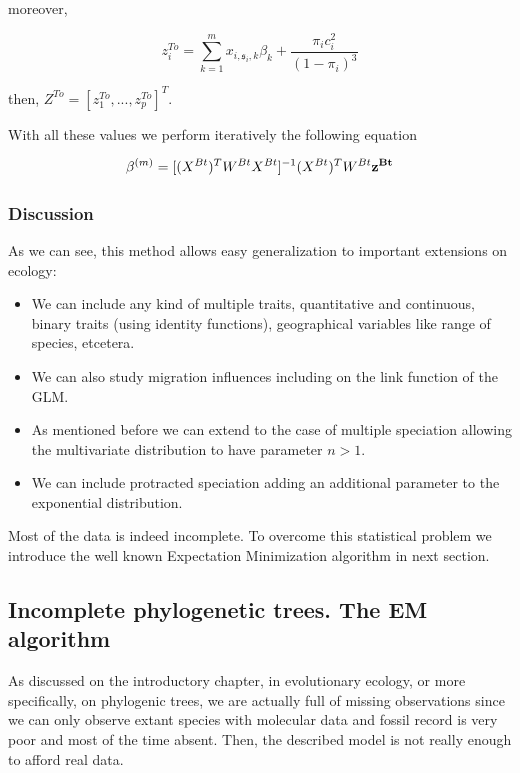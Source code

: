 moreover, 

$$ z_i^{To} = \displaystyle\sum_{k=1}^m x_{i,\mathfrak{s}_i,k} \beta_k + \frac{\pi_ic_i^2}{(1-\pi_i)^3} $$
	
	
then, $Z^{To} = [z_1^{To},...,z_p^{To}]^T$.

 With all these values we perform iteratively the following equation 
 
 $$\beta^{(m)}=[(X^{Bt})^TW^{Bt}X^{Bt}]^{-1}(X^{Bt})^TW^{Bt}\bf{z}^{Bt}$$
 
 \subsubsection*{Discussion}
 
 
As we can see, this method allows easy generalization to important extensions on ecology: 

\begin{itemize}
	\item We can include any kind of multiple traits, quantitative and continuous, binary traits (using identity functions), geographical variables like range of species, etcetera. 
	\item We can also study migration influences including on the link function of the GLM. 
	\item As mentioned before we can extend to the case of multiple speciation allowing the multivariate distribution to have parameter $n>1$.
	\item We can include protracted speciation adding an additional parameter to the exponential distribution.
	
\end{itemize} 
 
 
Most of the data is indeed incomplete. To overcome this statistical problem we introduce the well known Expectation Minimization algorithm in next section. 
 
\subsection{Incomplete phylogenetic trees. The EM algorithm}

As discussed on the introductory chapter, in evolutionary ecology, or more specifically, on phylogenic trees, we are actually full of missing observations since we can only observe extant species with molecular data and fossil record is very poor and most of the time absent. Then, the described model is not really enough to afford real data. 

